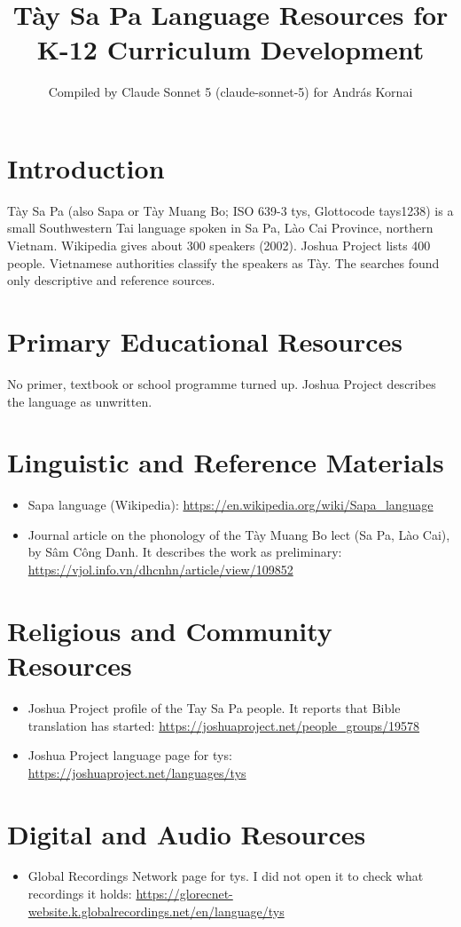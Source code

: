 \documentclass[12pt]{article}
\title{T\`ay Sa Pa Language Resources for K-12 Curriculum Development}
\author{Compiled by Claude Sonnet 5 (claude-sonnet-5) for Andr\'as Kornai}
\date{}
\begin{document}
\maketitle

\section{Introduction}
T\`ay Sa Pa (also Sapa or T\`ay Muang Bo; ISO 639-3 tys, Glottocode tays1238) is a small Southwestern Tai language spoken in Sa Pa, L\`ao Cai Province, northern Vietnam. Wikipedia gives about 300 speakers (2002). Joshua Project lists 400 people. Vietnamese authorities classify the speakers as T\`ay. The searches found only descriptive and reference sources.

\section{Primary Educational Resources}
No primer, textbook or school programme turned up. Joshua Project describes the language as unwritten.

\section{Linguistic and Reference Materials}
\begin{itemize}
\item Sapa language (Wikipedia): \url{https://en.wikipedia.org/wiki/Sapa_language}
\item Journal article on the phonology of the T\`ay Muang Bo lect (Sa Pa, L\`ao Cai), by S\^am C\^ong Danh. It describes the work as preliminary: \url{https://vjol.info.vn/dhcnhn/article/view/109852}
\end{itemize}

\section{Religious and Community Resources}
\begin{itemize}
\item Joshua Project profile of the Tay Sa Pa people. It reports that Bible translation has started: \url{https://joshuaproject.net/people_groups/19578}
\item Joshua Project language page for tys: \url{https://joshuaproject.net/languages/tys}
\end{itemize}

\section{Digital and Audio Resources}
\begin{itemize}
\item Global Recordings Network page for tys. I did not open it to check what recordings it holds: \url{https://glorecnet-website.k.globalrecordings.net/en/language/tys}
\end{itemize}
\end{document}
